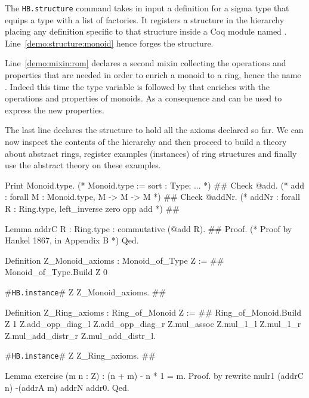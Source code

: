 \documentclass[a4paper,UKenglish,cleveref, autoref]{lipics-v2019}
\newcommand{\mixin}{mixin}
\newcommand{\factories}{factories}
\newcommand{\hbinstance}{{\tt\color{dkgreen}HB.instance}}
\newcommand{\hbstructure}{{\tt\color{dkgreen}HB.structure}}
\theoremstyle{implem}
\theoremstyle{implem}
\theoremstyle{command}
\theoremstyle{commands}
\begin{document}
The \hbstructure{} command takes in input a definition for a sigma type 
that equips a type with a list of \factories{}.
It registers a structure  in the hierarchy placing
any definition specific to that structure inside a Coq module named .
Line~\ref{demo:structure:monoid} hence forges the  structure.

Line~\ref{demo:mixin:rom} declares a second \mixin{} collecting the operations
and properties that are needed in order to enrich a monoid to a ring, hence
the name . Indeed this time the type variable 
is followed by  that enriches
 with the operations and properties of monoids. As a consequence
 and  can be used to express the new properties.

The last line declares the  structure to hold all the axioms declared
so far. We can now inspect the contents of the hierarchy and then
proceed to build a theory about abstract rings,
register examples (instances) of ring structures
and finally use the abstract theory on these examples.

\begin{coqcode}
Print Monoid.type. (* Monoid.type  :=  { sort : Type;  ... }                           *) #\label{demo:theory:print:type}#
Check @add.        (* add          :   forall M : Monoid.type, M -> M -> M             *) #\label{demo:theory:check:add}#
Check @addNr.      (* addNr        :   forall R : Ring.type, left_inverse zero opp add *) #\label{demo:theory:check:addNr}#

Lemma addrC {R : Ring.type} : commutative (@add R).                       #\label{demo:theory:state:addrC}#
Proof. (* Proof by Hankel 1867, in Appendix B *) Qed.

Definition Z_Monoid_axioms : Monoid_of_Type Z :=                         #\label{demo:theory:z:monoid:axioms}#
  Monoid_of_Type.Build Z 0%

#\hbinstance{}# Z Z_Monoid_axioms.                                            #\label{demo:theory:z:monoid:canonical}#

Definition Z_Ring_axioms : Ring_of_Monoid Z :=                        #\label{demo:theory:z:ring:axioms}#
  Ring_of_Monoid.Build Z 1%
    Z.add_opp_diag_l Z.add_opp_diag_r Z.mul_assoc Z.mul_1_l Z.mul_1_r
    Z.mul_add_distr_r Z.mul_add_distr_l.

#\hbinstance{}# Z Z_Ring_axioms.                                              #\label{demo:theory:z:ring:canonical}#

Lemma exercise (m n : Z) : (n + m) - n * 1 = m.
Proof. by rewrite mulr1 (addrC n) -(addrA m) addrN addr0. Qed.
\end{coqcode}
\end{document}
